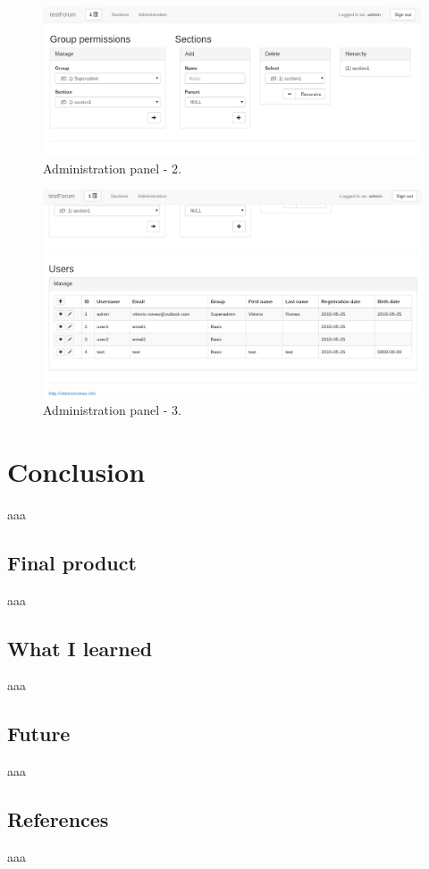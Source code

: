 \documentclass[12pt]{report}
\begin{document}
            \begin{figure}[!htb]
            \caption{Administration panel - 2.}
            \centering
            \includegraphics[width=1\textwidth]{u/9}
            \end{figure}

            \begin{figure}[!htb]
            \caption{Administration panel - 3.}
            \centering
            \includegraphics[width=1\textwidth]{u/10}
            \end{figure}


    \part{Conclusion}
        aaa

        \chapter{Final product}
            aaa

        \chapter{What I learned}
            aaa

        \chapter{Future}
            aaa

        \chapter{References}
            aaa
\end{document}
